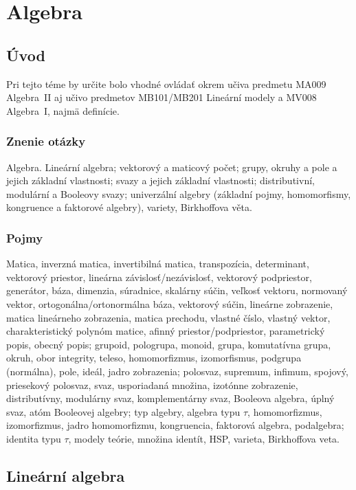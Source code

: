 \section{Algebra}

\subsection{Úvod}
Pri tejto téme by určite bolo vhodné ovládať
okrem učiva predmetu MA009 Algebra~II aj učivo
predmetov MB101/MB201 Lineární modely a MV008 Algebra~I, 
najmä definície.

\subsubsection{Znenie otázky}
Algebra. Lineární algebra; vektorový a maticový počet; grupy, okruhy
a pole a jejich základní vlastnosti; svazy a jejich základní vlastnosti;
distributivní, modulární a Booleovy svazy; univerzální algebry (základní 
pojmy, homomorfismy, kongruence a faktorové algebry), variety, Birkhoffova věta.

\subsubsection{Pojmy}
Matica, inverzná matica, invertibilná matica, transpozícia, determinant,
vektorový priestor, lineárna závislosť/nezávislosť, vektorový podpriestor,
generátor, báza, dimenzia, súradnice, skalárny súčin, veľkosť vektoru,
normovaný vektor, ortogonálna/ortonormálna báza, vektorový súčin, lineárne
zobrazenie, matica lineárneho zobrazenia, matica prechodu, vlastné číslo, 
vlastný vektor, charakteristický polynóm matice, afinný priestor/podpriestor,
parametrický popis, obecný popis; grupoid, pologrupa, monoid, grupa,
komutatívna grupa, okruh, obor integrity, teleso, homomorfizmus, izomorfismus,
podgrupa (normálna), pole, ideál, jadro zobrazenia; polosvaz, supremum, infimum,
spojový, priesekový polosvaz, svaz, usporiadaná množina, izotónne zobrazenie,
distributívny, modulárny svaz, komplementárny svaz, Booleova algebra, úplný
svaz, atóm Booleovej algebry; typ algebry, algebra typu $\tau$, homomorfizmus,
izomorfizmus, jadro homomorfizmu, kongruencia, faktorová algebra, podalgebra;
identita typu $\tau$, modely teórie, množina identít, HSP, varieta, Birkhoffova veta.

\subsection{Lineární algebra}

